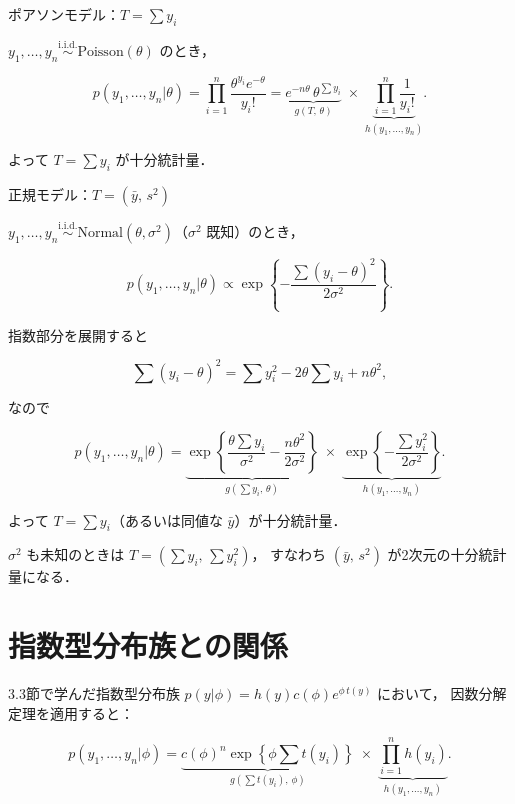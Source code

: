 \documentclass[lualatex,ja=standard,a4paper,12pt]{bxjsarticle}
\begin{document}
\begin{exbox}{ポアソンモデル：$T = \sum y_i$}

$y_1,\ldots,y_n \overset{\text{i.i.d.}}{\sim} \mathrm{Poisson}(\theta)$ のとき，

\[
  p(y_1,\ldots,y_n|\theta)
  = \prod_{i=1}^n \frac{\theta^{y_i} e^{-\theta}}{y_i!}
  = \underbrace{e^{-n\theta}\,\theta^{\sum y_i}}_{g(T,\,\theta)}
    \;\times\;
    \underbrace{\prod_{i=1}^n \frac{1}{y_i!}}_{h(y_1,\ldots,y_n)}.
\]

よって $T = \sum y_i$ が十分統計量．
\end{exbox}

\begin{exbox}{正規モデル：$T = (\bar{y},\, s^2)$}

$y_1,\ldots,y_n \overset{\text{i.i.d.}}{\sim} \mathrm{Normal}(\theta, \sigma^2)$（$\sigma^2$ 既知）のとき，

\[
  p(y_1,\ldots,y_n|\theta)
  \propto \exp\!\left\{-\frac{\sum(y_i - \theta)^2}{2\sigma^2}\right\}.
\]

指数部分を展開すると

\[
  \sum(y_i - \theta)^2
  = \sum y_i^2 - 2\theta \sum y_i + n\theta^2,
\]

なので

\[
  p(y_1,\ldots,y_n|\theta)
  = \underbrace{\exp\!\left\{\frac{\theta \sum y_i}{\sigma^2}
    - \frac{n\theta^2}{2\sigma^2}\right\}}_{g(\sum y_i,\,\theta)}
    \;\times\;
    \underbrace{\exp\!\left\{-\frac{\sum y_i^2}{2\sigma^2}\right\}}_{h(y_1,\ldots,y_n)}.
\]

よって $T = \sum y_i$（あるいは同値な $\bar{y}$）が十分統計量．

$\sigma^2$ も未知のときは $T = (\sum y_i,\, \sum y_i^2)$，
すなわち $(\bar{y},\, s^2)$ が2次元の十分統計量になる．

\end{exbox}

\section{指数型分布族との関係}

3.3節で学んだ指数型分布族 $p(y|\phi) = h(y)c(\phi)e^{\phi\,t(y)}$ において，
因数分解定理を適用すると：

\[
  p(y_1,\ldots,y_n|\phi)
  = \underbrace{c(\phi)^n \exp\!\left\{\phi \sum t(y_i)\right\}}_{g\left(\sum t(y_i),\,\phi\right)}
    \;\times\;
    \underbrace{\prod_{i=1}^n h(y_i)}_{h(y_1,\ldots,y_n)}.
\]
\end{document}
